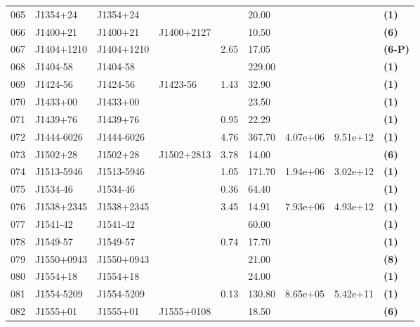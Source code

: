 \documentclass{jaa}
\begin{document}
\begin{table*}
\begin{minipage}{0.95\textwidth}
\begin{tabular}{|l|l|l|l|l|l|l|l|l|}
 065 & J1354+24    & J1354+24    &             &       &  20.00 &            &          &  {\bf (1)}   \\
 066 & J1400+21    & J1400+21    & J1400+2127  &       &  10.50 &            &          &  {\bf (6)}   \\
 067 & J1404+1210  & J1404+1210  &             &  2.65 &  17.05 &            &          &  {\bf (6-P)} \\
 068 & J1404-58    & J1404-58    &             &       & 229.00 &            &          &  {\bf (1)}   \\
 069 & J1424-56    & J1424-56    &  J1423-56   &  1.43 &  32.90 &            &          &  {\bf (1)}   \\
 070 & J1433+00    & J1433+00    &             &       &  23.50 &            &          &  {\bf (1)}   \\
 071 & J1439+76    & J1439+76    &             &  0.95 &  22.29 &            &          &  {\bf (1)}   \\
 072 & J1444-6026  & J1444-6026  &             &  4.76 & 367.70 &  4.07e+06  & 9.51e+12 &  {\bf (1)}   \\
 073 & J1502+28    & J1502+28    &  J1502+2813 &  3.78 &  14.00 &            &          &  {\bf (6)}   \\
 074 & J1513-5946  & J1513-5946  &             &  1.05 & 171.70 &  1.94e+06  & 3.02e+12 &  {\bf (1)}   \\
 075 & J1534-46    & J1534-46    &             &  0.36 &  64.40 &            &          &  {\bf (1)}   \\
 076 & J1538+2345  & J1538+2345  &             &  3.45 &  14.91 &  7.93e+06  & 4.93e+12 &  {\bf (1)}   \\
 077 & J1541-42    & J1541-42    &             &       &  60.00 &            &          &  {\bf (1)}   \\
 078 & J1549-57    & J1549-57    &             &  0.74 &  17.70 &            &          &  {\bf (1)}   \\
 079 & J1550+0943  & J1550+0943  &             &       &  21.00 &            &          &  {\bf (8)}   \\
 080 & J1554+18    & J1554+18    &             &       &  24.00 &            &          &  {\bf (1)}   \\
 081 & J1554-5209  & J1554-5209  &             &  0.13 & 130.80 &  8.65e+05  & 5.42e+11 &  {\bf (1)}   \\
 082 & J1555+01    & J1555+01    & J1555+0108  &       &  18.50 &            &          &  {\bf (6)}   \\

\end{tabular}
\end{minipage}
\end{table*}
\end{document}
